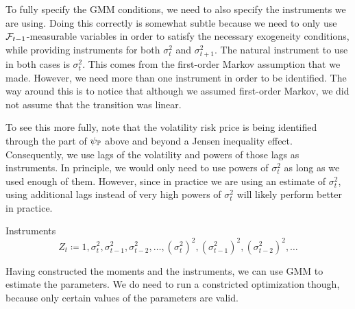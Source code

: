 \documentclass[11pt, letterpaper, twoside, final]{article}
\begin{document}
To fully specify the GMM conditions, we need to also specify the instruments we are using.
Doing this correctly is somewhat subtle because we need to only use $\mathcal{F}_{t-1}$-measurable variables in order to
satisfy the necessary exogeneity conditions, while providing instruments for both $\sigma^2_t$ and
$\sigma^2_{t+1}$. 
The natural instrument to use in both cases is $\sigma^2_t$.
This comes from the first-order Markov assumption that we made.
However, we need more than one instrument in order to be identified.
The way around this is to notice that although we assumed first-order Markov, we did not assume that the
transition was linear. 

To see this more fully, note that the volatility risk price is being identified through the part of $\psi_{\mathbb{P}}$
above and beyond a Jensen inequality effect.
Consequently, we use lags of the volatility and powers of those lags as instruments.
In principle, we would only need to use powers of $\sigma^2_t$ as long as we used enough of them.
However, since in practice we are using an estimate of $\sigma^2_t$, using additional lags instead of very high
powers of $\sigma^2_t$ will likely perform better in practice.


\begin{defn}{Instruments}
    \label{defn:instruments}
    \begin{equation}
        Z_t \coloneqq 1, \sigma^2_{t}, \sigma^2_{t-1}, \sigma^2_{t-2}, \ldots, (\sigma^2_{t})^2,
        (\sigma^2_{t-1})^2, (\sigma^2_{t-2})^2, \ldots
    \end{equation}
\end{defn}

Having constructed the moments and the instruments, we can use GMM to estimate the parameters.
We do need to run a constricted optimization though, because only certain values of the parameters are valid. 
\end{document}
